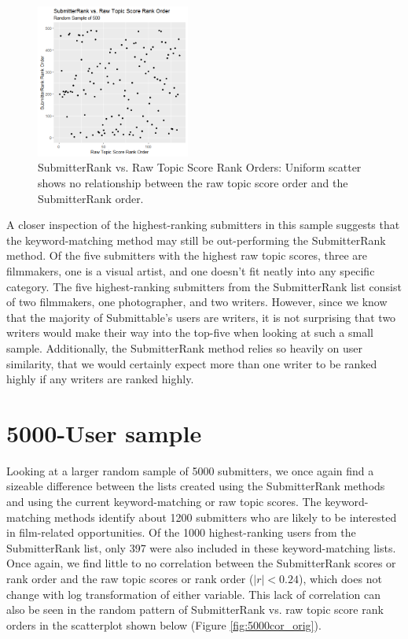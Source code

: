 \documentclass[]{report}   %
\begin{document}
\begin{figure}[h]
    \centering
    \begin{minipage}{0.9\textwidth}
	\captionsetup{font=scriptsize}
        \centering
        \includegraphics[width=0.45\textwidth]{rankOrder500_orig.png} %
        \caption{SubmitterRank vs. Raw Topic Score Rank Orders: Uniform scatter shows no relationship between the raw topic score order and the SubmitterRank order.}
	  \label{fig:500cor_orig}
    \end{minipage}
 \end{figure}

A closer inspection of the highest-ranking submitters in this sample suggests that the keyword-matching method may still be out-performing the SubmitterRank method. Of the five submitters with the highest raw topic scores, three are filmmakers, one is a visual artist, and one doesn't fit neatly into any specific category. The five highest-ranking submitters from the SubmitterRank list consist of two filmmakers, one photographer, and two writers. However, since we know that the majority of Submittable's users are writers, it is not surprising that two writers would make their way into the top-five when looking at such a small sample. Additionally, the SubmitterRank method relies so heavily on user similarity, that we would certainly expect more than one writer to be ranked highly if any writers are ranked highly.

\section{5000-User sample}

Looking at a larger random sample of 5000 submitters, we once again find a sizeable difference between the lists created using the SubmitterRank methods and using the current keyword-matching or raw topic scores. The keyword-matching methods identify about 1200 submitters who are likely to be interested in film-related opportunities. Of the 1000 highest-ranking users from the SubmitterRank list, only 397 were also included in these keyword-matching lists. Once again, we find little to no correlation between the SubmitterRank scores or rank order and the raw topic scores or rank order ($|r|<0.24$), which does not change with log transformation of either variable. This lack of correlation can also be seen in the random pattern of SubmitterRank vs. raw topic score rank orders in the scatterplot shown below (Figure \ref{fig:5000cor_orig}).
\end{document}
